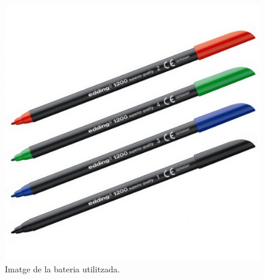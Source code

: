\begin{figure}[H]
	\centering
	\includegraphics[scale=0.3]{retolador.png}
	\caption{Imatge de la bateria utilitzada.}
	\label{fig:retolador}
\end{figure}